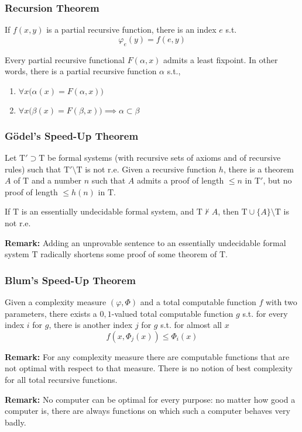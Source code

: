 \documentclass[UTF8,11pt,colorlinks,compress,openany]{beamer}%
\begin{document}
\begin{frame}\frametitle{Recursion Theorem}
	\begin{theorem}
		If $f(x,y)$ is a partial recursive function, there is an index $e$ s.t.
		\[\varphi_e(y)=f(e,y)\]
	\end{theorem}
	\begin{center}
	\end{center}
	\begin{theorem}
		Every partial recursive functional $F(\alpha,x)$ admits a least fixpoint. In other words, there is a partial recursive function $\alpha$ s.t.,
		\begin{enumerate}
			\item $\forall x\big(\alpha(x)=F(\alpha,x)\big)$
			\item $\forall x\big(\beta(x)=F(\beta,x)\big)\implies\alpha\subset\beta$
		\end{enumerate}
	\end{theorem}
\end{frame}

\begin{frame}\frametitle{G\"odel's Speed-Up Theorem}
	\begin{theorem}
		Let $\mathrm{T}'\supset\mathrm{T}$ be formal systems (with recursive sets of axioms and of recursive rules) such that $\mathrm{T}'\setminus\mathrm{T}$ is not r.e. Given a recursive function $h$, there is a theorem $A$ of $\mathrm{T}$ and a number $n$ such that $A$ admits a proof of length $\leq n$ in $\mathrm{T}'$, but no proof of length $\leq h(n)$ in $\mathrm{T}$.
	\end{theorem}
	\begin{proposition}
		If $\mathrm{T}$ is an essentially undecidable formal system, and $\mathrm{T}\nvdash A$, then $\mathrm{T}\cup\{A\}\setminus\mathrm{T}$ is not r.e.
	\end{proposition}
	\textbf{Remark:} Adding an unprovable sentence to an essentially undecidable formal system $\mathrm{T}$ radically shortens some proof of some theorem of $\mathrm{T}$.
\end{frame}

\begin{frame}\frametitle{Blum's Speed-Up Theorem}
	\begin{theorem}
		Given a complexity measure $(\varphi,\Phi)$ and a total computable function $f$ with two parameters, there exists a $0,1$-valued total computable function $g$ s.t. for every index $i$ for $g$, there is another index $j$ for $g$ s.t. for almost all $x$
		\[f(x,\Phi_{j}(x))\leq\Phi_{i}(x)\]
	\end{theorem}
	\textbf{Remark:} For any complexity measure there are computable functions that are not optimal with respect to that measure. There is no notion of best complexity for all total recursive functions.
	
	\textbf{Remark:} No computer can be optimal for every purpose: no matter how good a computer is, there are always functions on which such a computer behaves very badly.
\end{frame}
\end{document}
